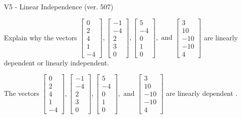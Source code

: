 \begin{exercise}
  \begin{exerciseTitle}V5 - Linear Independence (ver. 507)\end{exerciseTitle}
  \begin{exerciseStatement}
    Explain why the vectors \(\left[\begin{array}{r}
0 \\
2 \\
4 \\
1 \\
-4
\end{array}\right] , \left[\begin{array}{r}
-1 \\
-4 \\
2 \\
3 \\
0
\end{array}\right] , \left[\begin{array}{r}
5 \\
-4 \\
0 \\
1 \\
0
\end{array}\right] , \text{ and } \left[\begin{array}{r}
3 \\
10 \\
-10 \\
-10 \\
4
\end{array}\right]\) are linearly dependent or linearly independent.	


  \end{exerciseStatement}
  \begin{exerciseAnswer}
   The vectors \(\left[\begin{array}{r}
0 \\
2 \\
4 \\
1 \\
-4
\end{array}\right] , \left[\begin{array}{r}
-1 \\
-4 \\
2 \\
3 \\
0
\end{array}\right] , \left[\begin{array}{r}
5 \\
-4 \\
0 \\
1 \\
0
\end{array}\right] , \text{ and } \left[\begin{array}{r}
3 \\
10 \\
-10 \\
-10 \\
4
\end{array}\right]\) are 
  	 linearly dependent  .
  


  \end{exerciseAnswer}
\end{exercise}